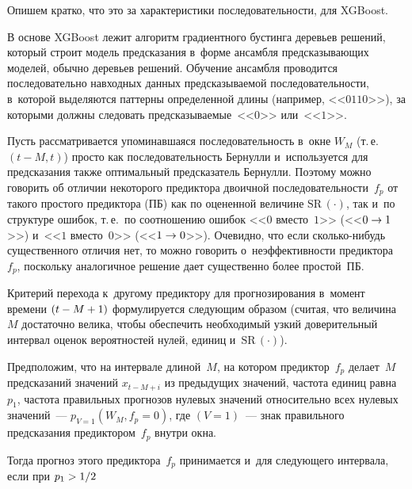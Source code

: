 \begin{multicols}{2}
  Опишем кратко, что это за характеристики последовательности, для 
XGBoost. 
  
  В основе XGBoost лежит алгоритм градиентного\linebreak
   бустинга деревьев 
решений, который строит модель предсказания в~форме ансамбля 
предсказывающих моделей, обычно деревьев решений. Обуче\-ние ансамбля 
проводится последовательно на\linebreak входных данных предсказываемой 
последовательности, в~которой выделяются паттерны определенной длины 
(например, <<$0110$>>), за которыми должны следовать 
предсказываемые~<<$0$>> или~<<$1$>>.
  
  Пусть рассматривается упоминавшаяся последовательность в~окне $W_M$ 
(т.\,е.\ $(t-M, t)$) просто как последовательность Бернулли и~используется 
для предсказания также оптимальный предсказатель Бернулли. Поэтому 
можно говорить об отличии некоторого предиктора двоичной 
последовательности~$f_p$ от такого простого предиктора (ПБ) как по 
оцененной величине $\mathrm{SR}\,(\cdot)$, так и~по структуре ошибок, 
т.\,е.\ по соотношению ошибок <<$0$ вмес\-то~$1$>> (<<$0\hm\to 1$>>) 
и~<<$1$ вместо~$0$>> (<<$1\hm\to 0$>>). Очевидно, что если сколь\-ко-ни\-будь 
существенного отличия нет, то можно говорить о~неэффективности 
предиктора~$f_p$, поскольку аналогичное решение дает существенно более 
прос\-той~ПБ.
  
  Критерий перехода к~другому предиктору для прогнозирования в~момент 
времени $(t\hm- M \hm+ 1)$ формулируется следующим образом (считая, что 
величина~$M$ достаточно велика, чтобы обеспечить необходимый узкий 
доверительный интервал оценок вероятностей нулей, единиц 
и~$\mathrm{SR}\,(\cdot)$). 
  
  Предположим, что на интервале длиной~$M$, на котором предиктор~$f_p$ 
делает~$M$ предсказаний значений $x_{t-M+i}$ из предыдущих значений, 
частота единиц равна~$p_1$, частота правильных прогнозов нулевых 
значений относительно всех нулевых значений~--- $p_{V=1}\left(W_M, 
f_p = 0\right)$, где $(V = 1)$~--- знак правильного предсказания 
предиктором~$f_p$ внутри окна. 
  
  Тогда прогноз этого предиктора~$f_p$ принимается и~для следующего 
интервала, если при $p_1\hm > 1/2$



\end{multicols}
